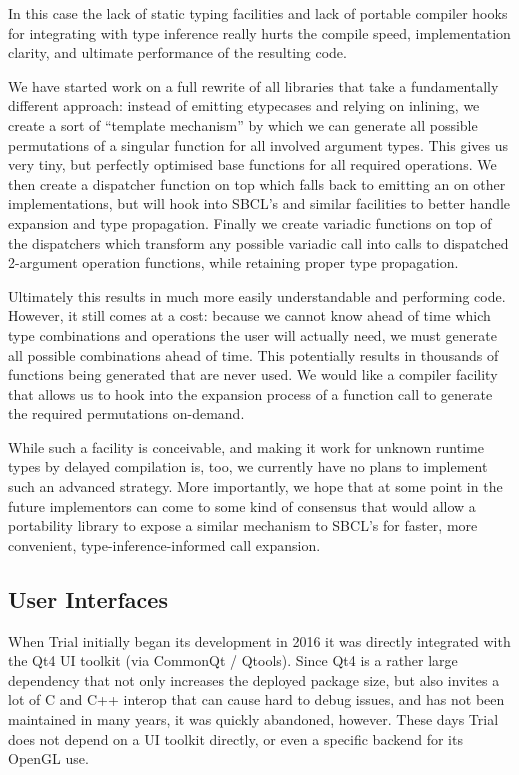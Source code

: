 \documentclass[format=sigconf]{acmart}
\begin{document}
In this case the lack of static typing facilities and lack of portable compiler hooks for integrating with type inference really hurts the compile speed, implementation clarity, and ultimate performance of the resulting code.

We have started work on a full rewrite of all libraries that take a fundamentally different approach: instead of emitting etypecases and relying on inlining, we create a sort of ``template mechanism'' by which we can generate all possible permutations of a singular function for all involved argument types. This gives us very tiny, but perfectly optimised base functions for all required operations. We then create a dispatcher function on top which falls back to emitting an  on other implementations, but will hook into SBCL's  and similar facilities to better handle expansion and type propagation. Finally we create variadic functions on top of the dispatchers which transform any possible variadic call into calls to dispatched 2-argument operation functions, while retaining proper type propagation.

Ultimately this results in much more easily understandable and performing code. However, it still comes at a cost: because we cannot know ahead of time which type combinations and operations the user will actually need, we must generate all possible combinations ahead of time. This potentially results in thousands of functions being generated that are never used. We would like a compiler facility that allows us to hook into the expansion process of a function call to generate the required permutations on-demand.

While such a facility is conceivable, and making it work for unknown runtime types by delayed compilation is, too, we currently have no plans to implement such an advanced strategy. More importantly, we hope that at some point in the future implementors can come to some kind of consensus that would allow a portability library to expose a similar mechanism to SBCL's  for faster, more convenient, type-inference-informed call expansion.

\subsection{User Interfaces}\label{ui}
When Trial initially began its development in 2016 it was directly integrated with the Qt4 UI toolkit (via CommonQt / Qtools). Since Qt4 is a rather large dependency that not only increases the deployed package size, but also invites a lot of C and C++ interop that can cause hard to debug issues, and has not been maintained in many years, it was quickly abandoned, however. These days Trial does not depend on a UI toolkit directly, or even a specific backend for its OpenGL use.
\end{document}
